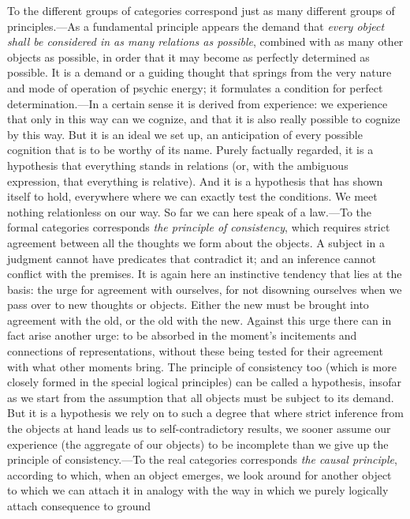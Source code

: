 \documentclass[12pt,a4paper]{book}
\newcommand{\opage}[1]{\marginnote{\footnotesize\textit{[#1]}}}
\begin{document}
To the different groups of categories correspond just as many different
groups of principles.---As a fundamental principle appears the demand that
\emph{every object shall be considered in as many relations as possible},
combined with as many other objects as possible, in order that it may become
as perfectly determined as possible. It is a demand or a guiding thought that
springs from the very nature and mode of operation of psychic energy; it
formulates a condition for perfect determination.---In a certain sense it is
derived from experience: we experience that only in this way can we cognize,
and that it is also really possible to cognize by this way. But it is an ideal
we set up, an anticipation of every possible cognition that is to be worthy of
its name. Purely factually regarded, it is a hypothesis that everything stands
in relations (or, with the ambiguous expression, that everything is relative).
And it is a hypothesis that has shown itself to hold, everywhere where we can
exactly test the conditions. We meet nothing relationless on our way. So far
we can here speak of a law.---To the formal categories corresponds \emph{the
principle of consistency}, which requires strict agreement between all the
thoughts we form about the objects. A subject in a judgment cannot have
predicates that contradict it; and an inference cannot conflict with the
\opage{256}premises. It is again here an instinctive tendency that lies at the basis: the
urge for agreement with ourselves, for not disowning ourselves when we pass
over to new thoughts or objects. Either the new must be brought into agreement
with the old, or the old with the new. Against this urge there can in fact
arise another urge: to be absorbed in the moment's incitements and connections
of representations, without these being tested for their agreement with what
other moments bring. The principle of consistency too (which is more closely
formed in the special logical principles) can be called a hypothesis, insofar
as we start from the assumption that all objects must be subject to its
demand. But it is a hypothesis we rely on to such a degree that where strict
inference from the objects at hand leads us to self-contradictory results, we
sooner assume our experience (the aggregate of our objects) to be incomplete
than we give up the principle of consistency.---To the real categories
corresponds \emph{the causal principle}, according to which, when an object
emerges, we look around for another object to which we can attach it in
analogy with the way in which we purely logically attach consequence to ground
\end{document}
